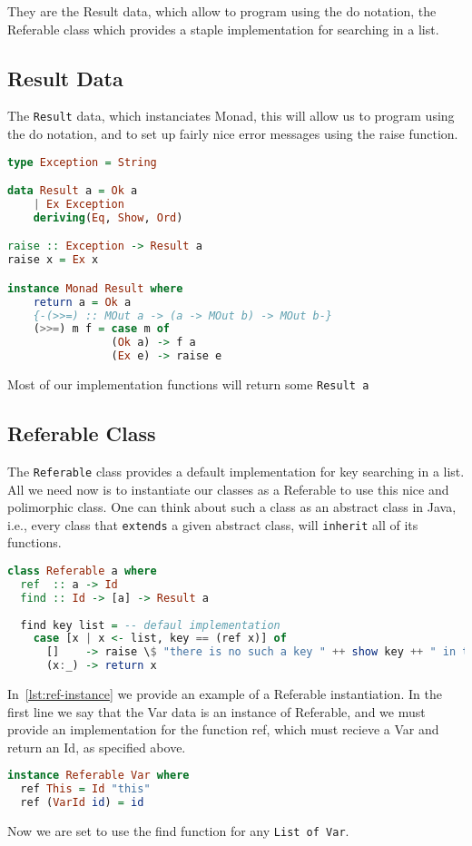 They are the Result data, which allow to program using the do notation, the
Referable class which provides a staple implementation for searching in a list.

\subsection{Result Data}
The \texttt{Result} data, which instanciates Monad, this will allow us
to program using the do notation, and to set up fairly nice error messages using the raise function.

\begin{lstlisting}[language=Haskell, frame=single, caption={Result Data Implementation}]
type Exception = String

data Result a = Ok a
	| Ex Exception
	deriving(Eq, Show, Ord)

raise :: Exception -> Result a
raise x = Ex x 

instance Monad Result where
	return a = Ok a
	{-(>>=) :: MOut a -> (a -> MOut b) -> MOut b-}
	(>>=) m f = case m of 
				(Ok a) -> f a
				(Ex e) -> raise e
\end{lstlisting}
Most of our implementation functions will return some \texttt{Result a}

\subsection{Referable Class}
The \texttt{Referable} class provides a default implementation for key
searching in a list. All we need now is to instantiate our classes as a
Referable to use this nice and polimorphic class.  One can think about such a
class as an abstract class in Java, i.e., every class that \texttt{extends} a
given abstract class, will \texttt{inherit} all of its functions.

\begin{lstlisting}[language=Haskell, frame=single, caption={The Referable Class Implementation}]
class Referable a where 
  ref  :: a -> Id
  find :: Id -> [a] -> Result a
 
  find key list = -- defaul implementation
    case [x | x <- list, key == (ref x)] of
      []    -> raise \$ "there is no such a key " ++ show key ++ " in the list."
      (x:_) -> return x  
\end{lstlisting}
      
In~\cref{lst:ref-instance} we provide an example of a Referable instantiation.
In the first line we say that the Var data is an instance of Referable, and we
must provide an implementation for the function ref, which must recieve a Var
and return an Id, as specified above.

\begin{lstlisting}[language=Haskell, frame=single, caption={A referable Instance}, label={lst:ref-instance}]
instance Referable Var where
  ref This = Id "this"
  ref (VarId id) = id
\end{lstlisting}
Now we are set to use the find function for any \texttt{List of Var}.


